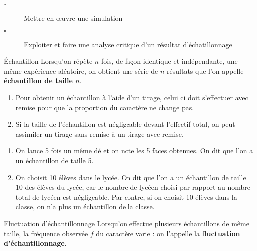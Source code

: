 \begin{titre}[Probabilités]

\end{titre}


\begin{CpsCol}
\begin{description}
\item[$\square$] Mettre en œuvre une simulation
\item[$\square$] Exploiter et faire une analyse critique d'un résultat d'échatillonnage
\end{description}
\end{CpsCol}



\begin{DefT}{Échantillon}
Lorsqu'on répète $n$ fois, de façon identique et indépendante, une même expérience aléatoire, on obtient une série
de $n$ résultats que l'on appelle \textbf{échantillon de taille $n$}.
\end{DefT}

\begin{Rq}
\begin{enumerate}
\item Pour obtenir un échantillon à l'aide d'un tirage, celui ci doit s'effectuer avec remise pour que la
proportion du caractère ne change pas.
\item Si la taille de l'échantillon est négligeable devant l'effectif total, on peut assimiler un tirage sans
remise à un tirage avec remise.
\end{enumerate}
\end{Rq}



\begin{Ex}
\begin{enumerate}
\item  On lance 5 fois un même dé et on note les 5 faces obtenues. On dit que l'on a un échantillon de
taille 5.
\item On choisit 10 élèves dans le lycée. On dit que l'on a un échantillon de taille 10 des élèves du lycée, car le nombre de
lycéen choisi par rapport au nombre total de lycéen est négligeable. Par contre, si on choisit 10 élèves
dans la classe, on n'a plus un échantillon de la classe.
\end{enumerate}
\end{Ex}

\begin{DefT}{Fluctuation d'échantillonnage}
Lorsqu'on effectue plusieurs échantillons de même taille, la fréquence observée $f$ du caractère
varie : on l'appelle la \textbf{fluctuation d'échantillonnage}.
\end{DefT}


